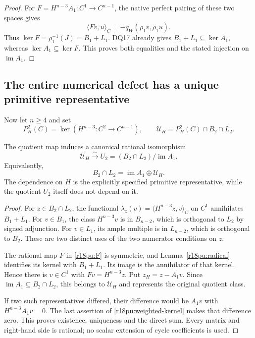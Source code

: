 \begin{proof}
For $F=H^{n-3}A_1:C^1\to C^{n-1}$, the native perfect
pairing of these two spaces gives
\[
                 \langle Fv,u\rangle_C
                         =-q_W(\rho_1v,\rho_1u).
 \tag{PU18.9}\label{r18pu:F}
\]
Thus $\ker F=\rho_1^{-1}(J)=B_1+L_1$.
DQ17 already gives $B_1+L_1\subseteq\ker A_1$, whereas
$\ker A_1\subseteq\ker F$.  This proves both equalities and
the stated injection on $\operatorname{im}A_1$.
\end{proof}

\subsection{The entire numerical defect has a unique primitive representative}

Now let $n\ge4$ and set
\[
 P_H^2(C)=\ker(H^{n-3}:C^2\to C^{n-1}),\qquad
 \mathscr U_H=P_H^2(C)\cap B_2\cap L_2 .
 \tag{PU18.10}\label{r18pu:primitive-space}
\]

\begin{theorem}
\label{r18pu:full-defect}
The quotient map induces a canonical rational isomorphism
\[
          \mathscr U_H\xrightarrow{\sim}
             U_2=(B_2\cap L_2)/\operatorname{im}A_1 .
 \tag{PU18.11}\label{r18pu:U-isomorphism}
\]
Equivalently,
\[
                    B_2\cap L_2
                       =\operatorname{im}A_1\oplus\mathscr U_H.
 \tag{PU18.12}\label{r18pu:direct-sum}
\]
The dependence on $H$ is the explicitly specified primitive
representative, while the quotient $U_2$ itself does not depend on it.
\end{theorem}

\begin{proof}
For $z\in B_2\cap L_2$, the functional
$\lambda_z(v)=\langle H^{n-3}z,v\rangle_C$ on $C^1$
annihilates $B_1+L_1$.
For $v\in B_1$, the class $H^{n-3}v$ is in $B_{n-2}$,
which is orthogonal to $L_2$ by signed adjunction.
For $v\in L_1$, its ample multiple is in $L_{n-2}$,
which is orthogonal to $B_2$.  These are two distinct
uses of the two numerator conditions on $z$.

The rational map $F$ in \eqref{r18pu:F} is symmetric, and
Lemma~\ref{r18pu:radical} identifies its kernel with $B_1+L_1$.
Its image is the annihilator of that kernel.  Hence there
is $v\in C^1$ with $Fv=H^{n-3}z$.  Put
$z_H=z-A_1v$.  Since $\operatorname{im}A_1\subseteq B_2\cap L_2$,
this belongs to $\mathscr U_H$ and represents the original
quotient class.

If two such representatives differed, their difference would
be $A_1v$ with $H^{n-3}A_1v=0$.  The last assertion of
\eqref{r18pu:weighted-kernel} makes that difference zero.
This proves existence, uniqueness and the direct sum.
Every matrix and right-hand side is rational; no scalar
extension of cycle coefficients is used.
\end{proof}


